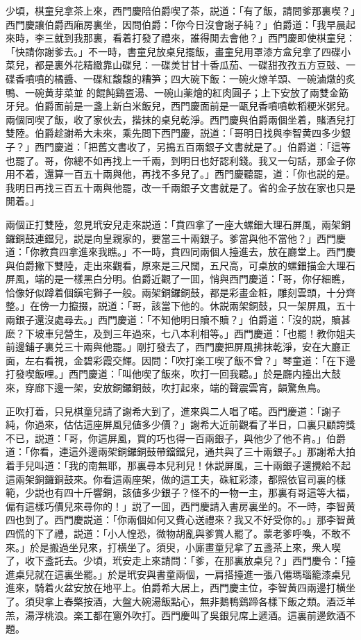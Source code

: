 少頃，棋童兒拿茶上來，西門慶陪伯爵喫了茶，説道：「有了飯，請問爹那裏喫？」西門慶讓伯爵西廂房裏坐，因問伯爵：「你今日沒會謝子純？」伯爵道：「我早晨起來時，李三就到我那裏，看着打發了禮來，誰得閒去會他？」西門慶即使棋童兒：「快請你謝爹去。」不一時，書童兒放桌兒擺飯，畫童兒用罩漆方盒兒拿了四碟小菜兒，都是裏外花精緻靠山碟兒：一碟羙甘甘十香瓜茄、一碟甜孜孜五方豆豉、一碟香噴噴的橘醬、一碟紅馥馥的糟笋；四大碗下飯：一碗火燎羊頭、一碗滷燉的炙鴨、一碗黄芽菜並𤆑的餛飩鷄疍湯、一碗山薬燴的紅肉圓子；上下安放了兩雙金筯牙兒。伯爵面前是一盞上新白米飯兒，西門慶面前是一甌兒香噴噴軟稻粳米粥兒。兩個同喫了飯，收了家伙去，揩抹的桌兒乾淨。西門慶與伯爵兩個坐着，賭酒兒打雙陸。伯爵趁謝希大未來，乘先問下西門慶，説道：「哥明日找與李智黄四多少銀子？」西門慶道：「把舊文書收了，另搗五百兩銀子文書就是了。」伯爵道：「這等也罷了。哥，你總不如再找上一千兩，到明日也好認利錢。我又一句話，那金子你用不着，還算一百五十兩與他，再找不多兒了。」西門慶聽罷，道：「你也説的是。我明日再找三百五十兩與他罷，改一千兩銀子文書就是了。省的金子放在家也只是閒着。」

兩個正打雙陸，忽見玳安兒走來説道：「賁四拿了一座大螺鈿大理石屏風，兩架銅鑼銅鼓連鐺兒，説是向皇親家的，要當三十兩銀子。爹當與他不當他？」西門慶道：「你教賁四拿進來我瞧。」不一時，賁四同兩個人擡進去，放在廳堂上。西門慶與伯爵撇下雙陸，走出來觀看，原來是三尺闊，五尺高，可桌放的螺鈿描金大理石屏風，端的是一樣黑白分明。伯爵近觀了一囬，悄與西門慶道：「哥，你仔細瞧，恰像好似蹲着個鎭宅獅子一般。兩架銅鑼銅鼓，都是彩畫金粧，雕刻雲頭，十分齊整。」在傍一力攛掇，説道：「哥，該當下他的。休説兩架銅鼓，只一架屏風，五十兩銀子還沒處尋去。」西門慶道：「不知他明日贖不贖？」伯爵道：「沒的説，贖甚麽？下坡車兒營生，及到三年過來，七八本利相等。」西門慶道：「也罷！教你姐夫前邊鋪子裏兑三十兩與他罷。」剛打發去了，西門慶把屏風拂抹乾淨，安在大廳正面，左右看視，金碧彩霞交輝。因問：「吹打楽工喫了飯不曾？」琴童道：「在下邊打發喫飯哩。」西門慶道：「叫他喫了飯來，吹打一回我聽。」於是廳内擡出大鼓來，穿廊下邊一架，安放銅鑼銅鼓，吹打起來，端的聲震雲宵，韻驚魚鳥。

正吹打着，只見棋童兒請了謝希大到了，進來與二人唱了喏。西門慶道：「謝子純，你過來，估估這座屏風兒値多少價？」謝希大近前觀看了半日，口裏只顧誇獎不已，説道：「哥，你這屏風，買的巧也得一百兩銀子，與他少了他不肯。」伯爵道：「你看，連這外邊兩架銅鑼銅鼓帶鐺鐺兒，通共與了三十兩銀子。」那謝希大拍着手兒叫道：「我的南無耶，那裏尋本兒利兒！休説屏風，三十兩銀子還攪給不起這兩架銅鑼銅鼓來。你看這兩座架，做的這工夫，硃紅彩漆，都照依官司裏的樣範，少説也有四十斤響銅，該値多少銀子？怪不的一物一主，那裏有哥這等大福，偏有這樣巧價兒來尋你的！」説了一囬，西門慶請入書房裏坐的。不一時，李智黄四也到了。西門慶説道：「你兩個如何又費心送禮來？我又不好受你的。」那李智黄四慌的下了禮，説道：「小人惶恐，微物胡亂與爹賞人罷了。蒙老爹呼喚，不敢不來。」於是搬過坐兒來，打横坐了。須臾，小廝畫童兒拿了五盞茶上來，衆人喫了，收下盞託去。少頃，玳安走上來請問：「爹，在那裏放桌兒？」西門慶令：「擡進桌兒就在這裏坐罷。」於是玳安與書童兩個，一肩搭擡進一張八僊瑪瑙籠漆桌兒進來，騎着火盆安放在地平上。伯爵希大居上，西門慶主位，李智黄四兩邊打横坐了。須臾拿上春檠按酒，大盤大碗湯飯點心，無非鵝鴨鷄蹄各樣下飯之類。酒泛羊羔，湯浮桃浪。楽工都在窻外吹打。西門慶叫了吳銀兒席上遞酒。這裏前邊飲酒不題。

